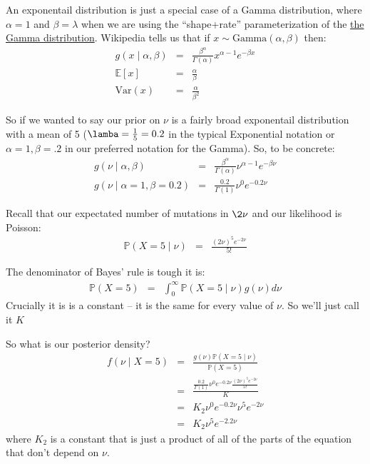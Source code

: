\documentclass[11pt]{article}
\renewcommand{\Pr}{\mathbb{P}}
\newcommand{\href}[2]{\url{#2}}
\begin{document}
An exponentail distribution is just a special case of a Gamma distribution,
where $\alpha=1$ and $\beta=\lambda$ when we are using the ``shape+rate'' parameterization of the \href{https://en.wikipedia.org/wiki/Gamma_distribution}{the Gamma distribution}.
Wikipedia tells us that if $x\sim \mbox{Gamma}(\alpha, \beta)$ then:
\begin{eqnarray}
g(x \mid \alpha, \beta) &=& \frac{\beta^{\alpha}}{\Gamma(\alpha)}x^{\alpha - 1}e^{-\beta x} \\
\mathbb{E}[x] & = & \frac{\alpha}{\beta} \\
\mbox{Var}(x) & = & \frac{\alpha}{\beta^2}
\end{eqnarray}


So if we wanted to say our prior on $\nu$ is a fairly broad exponentail
    distribution with a mean of 5 ($\lamba=\frac{1}{5}=0.2$ in the typical Exponential
    notation or $\alpha=1,\beta=.2$ in our preferred notation for the Gamma).
So, to be concrete:
\begin{eqnarray}
g(\nu \mid \alpha, \beta) &=& \frac{\beta^{\alpha}}{\Gamma(\alpha)}\nu^{\alpha - 1}e^{-\beta\nu} \\
g(\nu \mid \alpha=1, \beta=0.2) &=& \frac{0.2}{\Gamma(1)}\nu^{0}e^{-0.2\nu} 
\end{eqnarray}

Recall that our expectated number of mutations in $\2\nu$ and our likelihood is Poisson:
\begin{eqnarray}
\Pr(X=5\mid \nu) &= & \frac{(2\nu)^5e^{-2\nu}}{5!}
\end{eqnarray}

The denominator of Bayes' rule is tough it is:
\begin{eqnarray}
\Pr(X=5) &= &\int_0^{\infty} \Pr(X=5\mid \nu)g(\nu) d\nu
\end{eqnarray}
Crucially it is is a constant -- it is the same for every value of $\nu$.
So we'll just call it $K$

So what is our posterior density?
\begin{eqnarray}
f(\nu\mid X=5) & = & \frac{g(\nu)\Pr(X=5\mid \nu)}{\Pr(X=5)} \\
& = & \frac{\frac{0.2}{\Gamma(1)}\nu^{0}e^{-0.2\nu}\frac{(2\nu)^5e^{-2\nu}}{5!}}{K}\\
& = & K_2 \nu^{0}e^{-0.2\nu}\nu^{5}e^{-2\nu} \\
& = & K_2 \nu^{5}e^{-2.2\nu}
\end{eqnarray}
where $K_2$ is a constant that is just a product of all of the parts of
the equation that don't depend on $\nu$.
\end{document}
